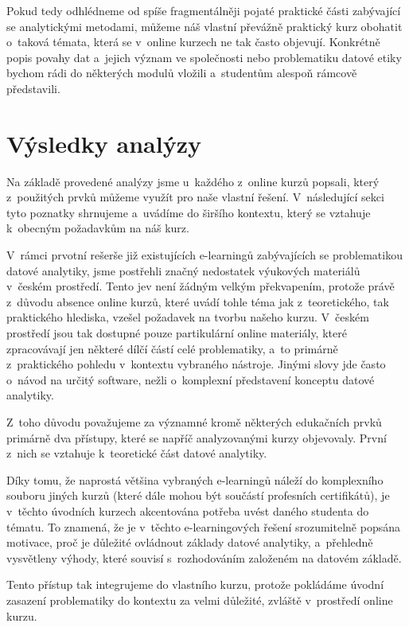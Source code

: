 Pokud tedy odhlédneme od spíše fragmentálněji pojaté praktické části zabývající se analytickými metodami, můžeme náš vlastní převážně praktický kurz obohatit o~taková témata, která se v~online kurzech ne tak často objevují. Konkrétně popis povahy dat a~jejich význam ve společnosti nebo problematiku datové etiky bychom rádi do některých modulů vložili a~studentům alespoň rámcově představili.

\hypertarget{vuxfdsledky-analuxfdzy}{%
\section{Výsledky analýzy}\label{vuxfdsledky-analuxfdzy}}

Na základě provedené analýzy jsme u~každého z~online kurzů popsali, který z~použitých prvků můžeme využít pro naše vlastní řešení. V~následující sekci tyto poznatky shrnujeme a~uvádíme do širšího kontextu, který se vztahuje k~obecným požadavkům na náš kurz.

V~rámci prvotní rešerše již existujících e-learningů zabývajících se problematikou datové analytiky, jsme postřehli značný nedostatek výukových materiálů v~českém prostředí. Tento jev není žádným velkým překvapením, protože právě z~důvodu absence online kurzů, které uvádí tohle téma jak z~teoretického, tak praktického hlediska, vzešel požadavek na tvorbu našeho kurzu. V~českém prostředí jsou tak dostupné pouze partikulární online materiály, které zpracovávají jen některé dílčí částí celé problematiky, a~to primárně z~praktického pohledu v~kontextu vybraného nástroje. Jinými slovy jde často o~návod na určitý software, nežli o~komplexní představení konceptu datové analytiky.

Z~toho důvodu považujeme za významné kromě některých edukačních prvků primárně dva přístupy, které se napříč analyzovanými kurzy objevovaly. První z~nich se vztahuje k~teoretické část datové analytiky.

Díky tomu, že naprostá většina vybraných e-learningů náleží do komplexního souboru jiných kurzů (které dále mohou být součástí profesních certifikátů), je v~těchto úvodních kurzech akcentována potřeba uvést daného studenta do tématu. To znamená, že je v~těchto e-learningových řešení srozumitelně popsána motivace, proč je důležité ovládnout základy datové analytiky, a~přehledně vysvětleny výhody, které souvisí s~rozhodováním založeném na datovém základě.

Tento přístup tak integrujeme do vlastního kurzu, protože pokládáme úvodní zasazení problematiky do kontextu za velmi důležité, zvláště v~prostředí online kurzu.

